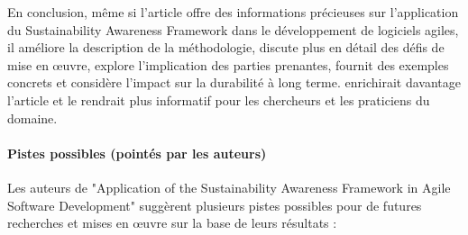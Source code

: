 En conclusion, même si l'article offre des informations précieuses sur l'application du Sustainability Awareness Framework dans le développement de logiciels agiles, il améliore la description de la méthodologie, discute plus en détail des défis de mise en œuvre, explore l'implication des parties prenantes, fournit des exemples concrets et considère l'impact sur la durabilité à long terme. enrichirait davantage l’article et le rendrait plus informatif pour les chercheurs et les praticiens du domaine.

\paragraph{Pistes possibles (pointés par les auteurs)}
Les auteurs de "Application of the Sustainability Awareness Framework in Agile Software Development" suggèrent plusieurs pistes possibles pour de futures recherches et mises en œuvre sur la base de leurs résultats :


